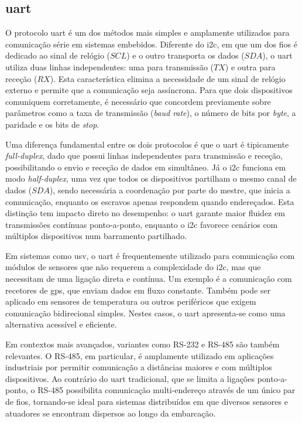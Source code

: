 \subsection{\acrfull{uart}} 
\label{subsec:uart}

O protocolo \gls{uart} é um dos métodos mais simples e amplamente utilizados para comunicação série em sistemas embebidos. Diferente do \gls{i2c}, em que um dos fios é dedicado ao sinal de relógio (\(SCL\)) e o outro transporta os dados (\(SDA\)), o \gls{uart} utiliza duas linhas independentes: uma para transmissão (\(TX\)) e outra para receção (\(RX\)). Esta característica elimina a necessidade de um sinal de relógio externo e permite que a comunicação seja assíncrona. Para que dois dispositivos comuniquem corretamente, é necessário que concordem previamente sobre parâmetros como a taxa de transmissão (\emph{baud rate}), o número de bits por \emph{byte}, a paridade e os bits de \emph{stop}.

Uma diferença fundamental entre os dois protocolos é que o \gls{uart} é tipicamente \textit{full-duplex}, dado que possui linhas independentes para transmissão e receção, possibilitando o envio e receção de dados em simultâneo. Já o \gls{i2c} funciona em modo \textit{half-duplex}, uma vez que todos os dispositivos partilham o mesmo canal de dados (\(SDA\)), sendo necessária a coordenação por parte do mestre, que inicia a comunicação, enquanto os escravos apenas respondem quando endereçados. Esta distinção tem impacto direto no desempenho: o \gls{uart} garante maior fluidez em transmissões contínuas ponto-a-ponto, enquanto o \gls{i2c} favorece cenários com múltiplos dispositivos num barramento partilhado.

Em sistemas como \gls{usv}, o \gls{uart} é frequentemente utilizado para comunicação com módulos de sensores que não requerem a complexidade do \gls{i2c}, mas que necessitam de uma ligação direta e contínua. Um exemplo é a comunicação com recetores de \gls{gps}, que enviam dados em fluxo constante. Também pode ser aplicado em sensores de temperatura ou outros periféricos que exigem comunicação bidirecional simples. Nestes casos, o \gls{uart} apresenta-se como uma alternativa acessível e eficiente.

Em contextos mais avançados, variantes como RS-232 e RS-485 são também relevantes. O RS-485, em particular, é amplamente utilizado em aplicações industriais por permitir comunicação a distâncias maiores e com múltiplos dispositivos. Ao contrário do \gls{uart} tradicional, que se limita a ligações ponto-a-ponto, o RS-485 possibilita comunicação multi-endereço através de um único par de fios, tornando-se ideal para sistemas distribuídos em que diversos sensores e atuadores se encontram dispersos ao longo da embarcação.

